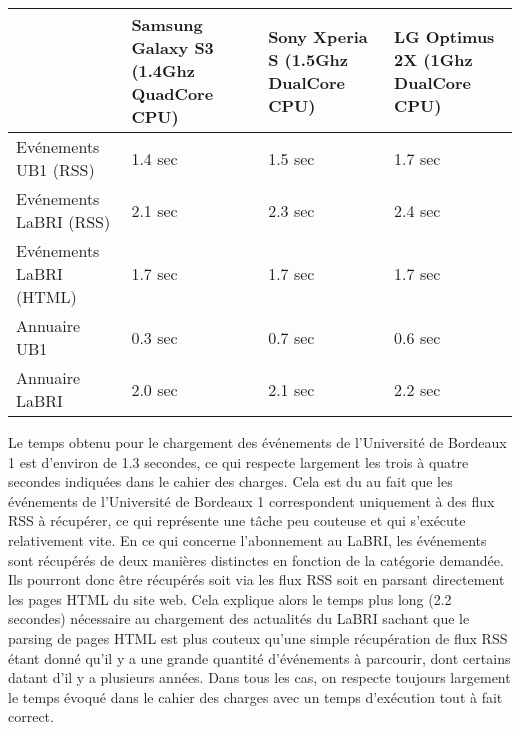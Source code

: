 \begin{table}[h]
\begin{adjustbox}{minipage=1.12\textwidth,margin=0pt \smallskipamount,center}
\begin{tabular}{|l|p{2.8cm}|p{2.8cm}|p{2.8cm}|}
	\hline
	~ & Samsung Galaxy S3 (1.4Ghz QuadCore CPU) & Sony Xperia S (1.5Ghz DualCore CPU) & LG Optimus 2X (1Ghz DualCore CPU) \\ \hline
	Evénements UB1 (RSS) & 1.4 sec & 1.5 sec & 1.7 sec \\ \hline
	Evénements LaBRI (RSS) & 2.1 sec & 2.3 sec & 2.4 sec \\ \hline
	Evénements LaBRI (HTML) & 1.7 sec & 1.7 sec & 1.7 sec \\ \hline
	Annuaire UB1 & 0.3 sec & 0.7 sec & 0.6 sec \\ \hline
	Annuaire LaBRI & 2.0 sec & 2.1 sec & 2.2 sec \\ \hline
\end{tabular}
\end{adjustbox}
\end{table}

Le temps obtenu pour le chargement des événements de l'Université de Bordeaux 1 est d'environ de 1.3 secondes, ce qui respecte largement les trois à quatre secondes indiquées dans le cahier des charges. Cela est du au fait que les événements de l'Université de Bordeaux 1 correspondent uniquement à des flux RSS à récupérer, ce qui représente une tâche peu couteuse et qui s'exécute relativement vite.
En ce qui concerne l'abonnement au LaBRI, les événements sont récupérés de deux manières distinctes en fonction de la catégorie demandée. Ils pourront donc être récupérés soit via les flux RSS soit en parsant directement les pages HTML du site web. Cela explique alors le temps plus long (2.2 secondes) nécessaire au chargement des actualités du LaBRI sachant que le parsing de pages HTML est plus couteux qu'une simple récupération de flux RSS étant donné qu'il y a une grande quantité d'événements à parcourir, dont certains datant d'il y a plusieurs années. Dans tous les cas, on respecte toujours largement le temps évoqué dans le cahier des charges avec un temps d'exécution tout à fait correct.\\\\
 

